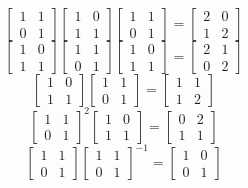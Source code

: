 \documentclass{article}
\begin{document}
    \[ \begin{bmatrix} 1 & 1 \\
        0 & 1 \end{bmatrix}
        \begin{bmatrix} 1 & 0 \\
            1 & 1 \end{bmatrix}
        \begin{bmatrix} 1 & 1 \\
            0 & 1 \end{bmatrix}
        = \begin{bmatrix} 2 & 0 \\
        1 & 2 \end{bmatrix}  \]
    \[ \begin{bmatrix} 1 & 0 \\
        1 & 1 \end{bmatrix}
        \begin{bmatrix} 1 & 1 \\
            0 & 1 \end{bmatrix}
        \begin{bmatrix} 1 & 0 \\
            1 & 1 \end{bmatrix}
        = \begin{bmatrix} 2 & 1 \\
        0 & 2 \end{bmatrix}  \]
    \[ \begin{bmatrix} 1 & 0 \\
        1 & 1 \end{bmatrix}
        \begin{bmatrix} 1 & 1 \\
            0 & 1 \end{bmatrix}
        = \begin{bmatrix} 1 & 1 \\
        1 & 2 \end{bmatrix}  \]
    \[ \begin{bmatrix} 1 & 1 \\
        0 & 1 \end{bmatrix}^2
        \begin{bmatrix} 1 & 0 \\
            1 & 1 \end{bmatrix}
        = \begin{bmatrix} 0 & 2 \\
        1 & 1 \end{bmatrix}  \]
    \[ \begin{bmatrix} 1 & 1 \\
        0 & 1 \end{bmatrix}
        \begin{bmatrix} 1 & 1 \\
        0 & 1 \end{bmatrix}^{-1}
        = \begin{bmatrix} 1 & 0 \\
        0 & 1 \end{bmatrix} \]
\end{document}
